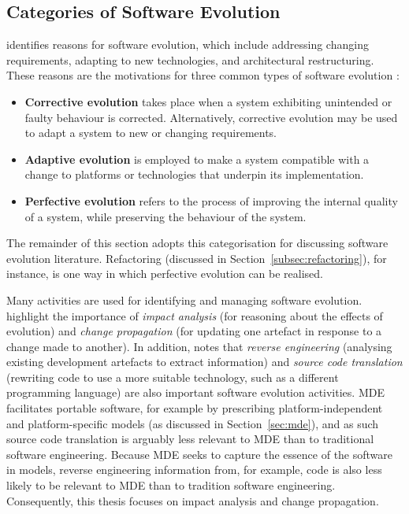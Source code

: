 \subsection{Categories of Software Evolution}
\cite{sjoberg93quantifying} identifies reasons for software evolution, which include addressing changing requirements, adapting to new technologies, and architectural restructuring. These reasons are the motivations for three common types of software evolution \cite[ch. 21]{sommerville06software}:

\begin{itemize}
 \item \textbf{Corrective evolution} takes place when a system exhibiting unintended or faulty behaviour is corrected. Alternatively, corrective evolution may be used to adapt a system to new or changing requirements. 
 \item \textbf{Adaptive evolution} is employed to make a system compatible with a change to platforms or technologies that underpin its implementation.
 \item \textbf{Perfective evolution} refers to the process of improving the internal quality of a system, while preserving the behaviour of the system. 
\end{itemize}

The remainder of this section adopts this categorisation for discussing software evolution literature. Refactoring (discussed in Section~\ref{subsec:refactoring}), for instance, is one way in which perfective evolution can be realised.

Many activities are used for identifying and managing software evolution. \cite{winkler09survey} highlight the importance of \emph{impact analysis} (for reasoning about the effects of evolution) and \emph{change propagation} (for updating one artefact in response to a change made to another). In addition, \cite{sommerville06software} notes that \emph{reverse engineering} (analysing existing development artefacts to extract information) and \emph{source code translation} (rewriting code to use a more suitable technology, such as a different programming language) are also important software evolution activities. MDE facilitates portable software, for example by prescribing platform-independent and platform-specific models (as discussed in Section~\ref{sec:mde}), and as such source code translation is arguably less relevant to MDE than to traditional software engineering. Because MDE seeks to capture the essence of the software in models, reverse engineering information from, for example, code is also less likely to be relevant to MDE than to tradition software engineering. Consequently, this thesis focuses on impact analysis and change propagation.

